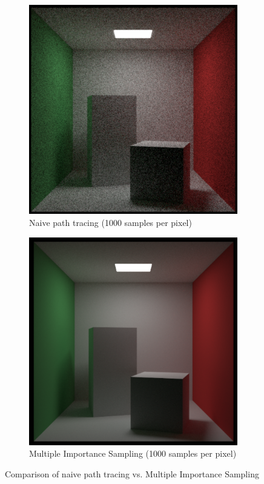 \documentclass[12pt]{article}
\begin{document}
\begin{figure}[H]
    \centering
    \begin{subfigure}[b]{0.45\textwidth}
        \centering
        \includegraphics[width=\textwidth]{images/noisy_cornell.png}
        \caption{Naive path tracing (1000 samples per pixel)}
        \label{fig:naive_sampling}
    \end{subfigure}
    \hfill
    \begin{subfigure}[b]{0.45\textwidth}
        \centering
        \includegraphics[width=\textwidth]{images/cornell_box.png}
        \caption{Multiple Importance Sampling (1000 samples per pixel)}
        \label{fig:mis_sampling}
    \end{subfigure}
    \caption{Comparison of naive path tracing vs. Multiple Importance Sampling}
    \label{fig:sampling_comparison}
\end{figure}
\end{document}
